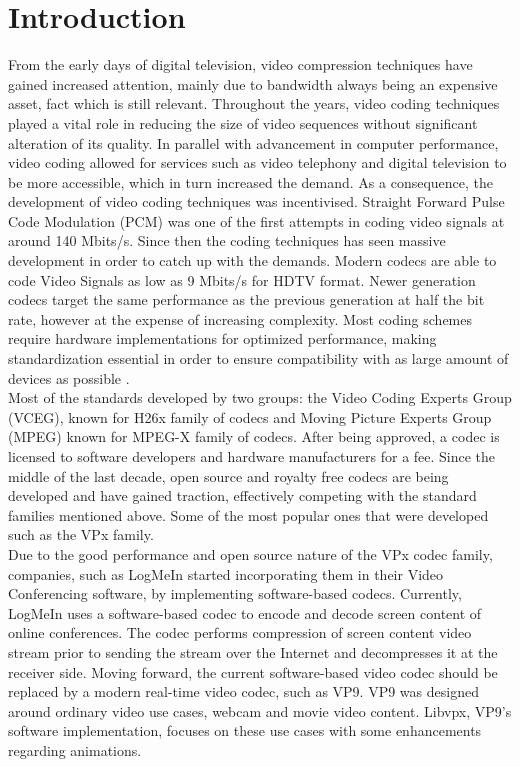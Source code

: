 \documentclass[a4paper,11pt,oneside]{article}
\begin{document}
\section{Introduction}
\indent From the early days of digital television, video compression techniques have gained increased attention, mainly due to bandwidth always being
an expensive asset, fact which is still relevant. Throughout the years, video coding techniques played a vital role in reducing the size of video sequences without significant alteration of its quality. In parallel with advancement in computer performance, video coding allowed for services such as video telephony and digital television to be more accessible, which in turn increased the demand. As a consequence, the development of video coding techniques was incentivised.
Straight Forward Pulse Code Modulation (PCM) was one of the first attempts in coding video signals at around 140 Mbits/s. Since then the coding techniques has seen massive development in order to catch up with the demands. Modern codecs are able to code Video Signals as low as 9 Mbits/s for HDTV format. Newer generation codecs target the same performance as the previous generation at half the  bit rate, however at the expense of increasing complexity. Most coding schemes require hardware implementations for optimized performance, making standardization essential in order to ensure compatibility with as large amount of devices
as possible \cite{ghanbari2011standard} . \\
\indent Most of the standards developed by two groups: the Video Coding Experts Group (VCEG), known for H26x family of codecs and Moving Picture Experts Group (MPEG) known for MPEG-X family of codecs. After being approved, a codec is licensed to software developers and hardware manufacturers for a fee. Since the middle of the last decade, open source and royalty free codecs are being developed and have gained traction, effectively competing with the standard families mentioned above. Some of the most popular ones that were developed such as the VPx family. \\
\indent Due to the good performance and open source nature of the VPx codec family, companies, such as LogMeIn started incorporating them in their Video Conferencing software, by implementing software-based codecs. Currently, LogMeIn uses a software-based codec to encode and decode screen content of online conferences. The codec performs compression of screen content video stream prior to sending the stream over the Internet and decompresses it at the receiver side. Moving forward, the current software-based video codec should be replaced by a modern real-time video codec, such as VP9. VP9 was designed around ordinary video use cases, webcam and movie video content. Libvpx, VP9’s software implementation, focuses on these use cases with some enhancements regarding animations. 
\end{document}
